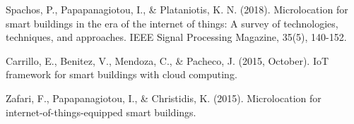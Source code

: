 \documentclass[conference]{IEEEtran}
\begin{document}
\begin{thebibliography}{00}
 Spachos, P., Papapanagiotou, I., \& Plataniotis, K. N. (2018). Microlocation for smart buildings in the era of the internet of things: A survey of technologies, techniques, and approaches. IEEE Signal Processing Magazine, 35(5), 140-152.

 Carrillo, E., Benitez, V., Mendoza, C., \& Pacheco, J. (2015, October). IoT framework for smart buildings with cloud computing. 

Zafari, F., Papapanagiotou, I., \& Christidis, K. (2015). Microlocation for internet-of-things-equipped smart buildings. 

\end{thebibliography}
\end{document}
